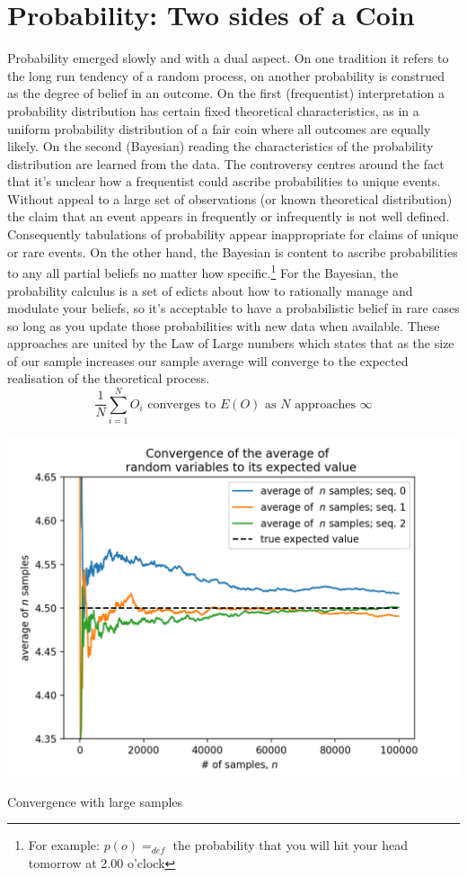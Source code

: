\documentclass{tufte-handout}
\begin{document}
\section{Probability: Two sides of a Coin}
\label{sec:Probability}
Probability emerged slowly and with a dual aspect. On one tradition it refers to the long run tendency of a random process, on another probability is construed as the degree of belief in an outcome. On the first (frequentist) interpretation a probability distribution has certain fixed theoretical characteristics, as in a uniform probability distribution of a fair coin where all outcomes are equally likely. On the second (Bayesian) reading the characteristics of the probability distribution are learned from the data. The controversy centres around the fact that it's unclear how a frequentist could ascribe probabilities to unique events. Without appeal to a large set of observations (or known theoretical distribution) the claim that an event appears in frequently or infrequently is not well defined. Consequently tabulations of probability appear inappropriate for claims of unique or rare events. On the other hand, the Bayesian is content to ascribe probabilities to any all partial beliefs no matter how specific.\footnote{For example: $p(o) =_{def}$ the probability that you will hit your head tomorrow at 2.00 o'clock} For the Bayesian, the probability calculus is a set of edicts about how to rationally manage and modulate your beliefs, so it's acceptable to have a probabilistic belief in rare cases so long as you update those probabilities with new data when available. These approaches are united by the Law of Large numbers which states that as the size of our sample increases our sample average will converge to the expected realisation of the theoretical process.
$$  \frac{1}{N} \sum_{i = 1}^{N} O_{i} \text{ converges to }  E(O) \text{ as } N \text{ approaches } \infty $$ 
\begin{marginfigure}
  \includegraphics[width=\linewidth]{../Expectation/Plots/convergence_of_law_of_large_numbers.png}
  \caption{Convergence with large samples}
\end{marginfigure}
\end{document}
